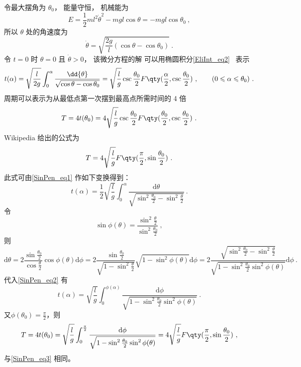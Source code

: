 

令最大摆角为 $\theta_0$， 能量守恒， 机械能为
\begin{equation}
E = \frac{1}{2} m l^2 \dot \theta^2 - mg l \cos\theta = - mg l \cos\theta_0~,
\end{equation}
所以 $\theta$ 处的角速度为
\begin{equation}
\dot{\theta} = \sqrt{\frac{2g}{l} (\cos\theta - \cos\theta_0) }~.
\end{equation}
令 $t = 0$ 时 $\theta = 0$ 且 $\dot{\theta} > 0$， 该微分方程的解%
可以用椭圆积分\autoref{EliInt_eq2}~ 表示
\begin{equation}\label{SinPen_eq1}
t(\alpha) = \sqrt{\frac{l}{2g}} \int_0^{\alpha} \frac{\dd{\theta}}{\sqrt{\cos\theta - \cos\theta_0}}
= \sqrt{\frac{l}{g}} \csc\frac{\theta_0}{2} F\qty(\frac{\alpha}{2}, \csc\frac{\theta_0}{2})~,
\qquad (0 \leqslant \alpha \leqslant \theta_0)~.
\end{equation}
周期可以表示为从最低点第一次摆到最高点所需时间的 4 倍
\begin{equation}
T = 4t(\theta_0) = 4 \sqrt{\frac{l}{g}} \csc\frac{\theta_0}{2} F\qty(\frac{\theta_0}{2}, \csc\frac{\theta_0}{2})~.
\end{equation}
Wikipedia 给出的公式为
\begin{equation}\label{SinPen_eq3}
T = 4 \sqrt{\frac{l}{g}} F\qty(\frac{\pi}{2}, \sin\frac{\theta_0}{2})~.
\end{equation}
此式可由\autoref{SinPen_eq1} 作如下变换得到：
\begin{equation}\label{SinPen_eq2}
t(\alpha)=\frac12\sqrt{\frac{l}{g}}\int_{0}^{\alpha}\frac{\mathrm{d}\theta}{\sqrt{\sin^2\frac{\theta_0}2-\sin^2\frac{\theta}2}}~.
\end{equation}
令
\begin{equation}
\sin \phi(\theta)=\frac{\sin^2\frac{\theta}2}{\sin^2\frac{\theta_0}2}~,
\end{equation}
则
\begin{equation}
\mathrm d\theta=2\frac{\sin\frac{\theta_0}2}{\cos\frac{\theta}2}\cos\phi(\theta)\mathrm d\phi
=2\frac{\sin\frac{\theta_0}2}{\sqrt{1-\sin^2\frac{\theta}2}}\sqrt{1-\sin^2\phi(\theta)}\mathrm d\phi
=2\frac{\sqrt{\sin^2\frac{\theta_0}2-\sin^2\frac{\theta}2}}{\sqrt{1-\sin^2\frac{\theta_0}2\sin^2{\phi(\theta)}}}\mathrm d\phi~.
\end{equation}
代入\autoref{SinPen_eq2} 有
\begin{equation}
t(\alpha)=\sqrt{\frac{l}{g}}\int_{0}^{\phi(\alpha)}\frac{\mathrm{d}\phi}{\sqrt{1-\sin^2\frac{\theta_0}2\sin^2{\phi(\theta)}}}~.
\end{equation}
又$\phi(\theta_0)=\frac\pi2$，则
\begin{equation}
T=4t(\theta_0)=\sqrt{\frac{l}{g}}\int_{0}^{\frac\pi2}\frac{\mathrm{d}\phi}{\sqrt{1-\sin^2\frac{\theta_0}2\sin^2{\phi(\theta)}}}=4 \sqrt{\frac{l}{g}} F\qty(\frac{\pi}{2}, \sin\frac{\theta_0}{2})~,
\end{equation}
与\autoref{SinPen_eq3} 相同。


